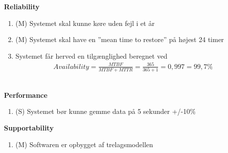 \textbf{Reliability}\\
\begin{enumerate}
	\item (M) Systemet skal kunne køre uden fejl i et år\\
	\item (M) Systemet skal have en ”mean time to restore” på højest 24 timer\\
	\item Systemet får herved en tilgænglighed beregnet ved \begin{align}
Availability = \frac{MTBF}{MTBF+MTTR} = \frac{365}{365+1} = 0,997 = 99,7 \%
\end{align}\\
\end{enumerate}

\textbf{Performance}\\
\begin{enumerate}
	\item (S) Systemet bør kunne gemme data på 5 sekunder +/-10\%\\
\end{enumerate}

\textbf{Supportability}\\
\begin{enumerate}
	\item (M) Softwaren er opbygget af trelagsmodellen\\
\end{enumerate}




















